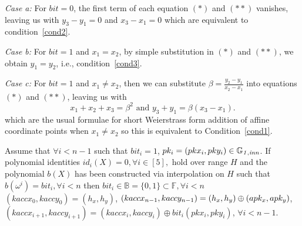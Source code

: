 \noindent \textit{Case a:} For $\mathit{bit}=0$, the first term of each equation $(\ast)$ and $(\ast \ast)$ vanishes, 
leaving us with $y_3-y_1=0$ and $x_3-x_1=0$ which are equivalent to condition~\ref{cond2}. \\
\vspace{-0.1in}

\noindent \textit{Case b:} For $\mathit{bit}=1$ and $x_1=x_2$, by simple substitution in $(\ast)$ and $(\ast \ast)$, 
we obtain $y_1 = y_2$, i.e., condition~\ref{cond3}.  \\
\vspace{-0.1in}

\noindent \textit{Case c:} For $\mathit{bit}=1$ and $x_1 \neq x_2$, then we can substitute
$\beta=\frac{y_2-y_1}{x_2-x_1}$ into equations $(\ast)$ and $(\ast \ast)$, leaving us with
$$x_1+x_2+x_3=\beta^2 \textrm{ and } y_3+y_1=\beta(x_3-x_1).$$
which are the usual formulae for short Weierstrass form addition of affine coordinate points when $x_1 \neq x_2$ 
so this is equivalent to Condition~\ref{cond1}. \\
\vspace{-0.1in}


\begin{test_claim} Assume that $\forall i < n-1$ such that $\mathit{bit}_i = 1$, $pk_i = (pkx_i, pky_i) \in \mathbb{G}_{\mathit{1,inn}}$. 
If polynomial identities $id_i(X) = 0, \forall i \in [5],$ hold over range 
$H$ and the polynomial $b(X)$ has been constructed via interpolation on $H$ such that $b(\omega^i) = \mathit{bit}_i, \forall i <n$ then $\mathit{bit}_i \in \mathbb{B} = \{0,1\} \subset \mathbb{F}, \forall i <n$ \\
$(kaccx_{0}, kaccy_{0}) = (h_x, h_y)$, $(kaccx_{n-1}, kaccy_{n-1}) = (h_x, h_y)\\ \oplus (apk_x, apk_y)$, 
$(kaccx_{i+1}, kaccy_{i+1}) =  (kaccx_{i}, kaccy_{i}) \oplus \mathit{bit}_i(pkx_{i}, pky_{i})$, $\forall i < n-1$.
\label{claim:keys_affine_comm}
\end{test_claim}
\vspace{-0.08in}

